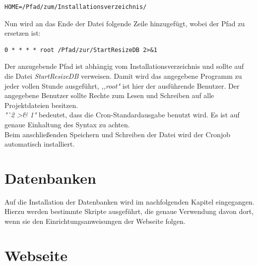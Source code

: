 \documentclass[fontsize = 12pt, paper = a4]{scrreprt}
\begin{document}
\vspace*{4mm}
\begin{lstlisting}[frame=single]
HOME=/Pfad/zum/Installationsverzeichnis/ 
\end{lstlisting} 
\vspace*{-2mm}

\newpage


Nun wird an das Ende der Datei folgende Zeile hinzugefügt, wobei der Pfad zu ersetzen ist:

\vspace*{4mm}
\begin{lstlisting}[frame=single]
0 * * * * root /Pfad/zur/StartResizeDB 2>&1 
\end{lstlisting} 
\vspace*{-2mm}


Der anzugebende Pfad ist abhängig vom Installationsverzeichnis und sollte auf die Datei \textit{StartResizeDB} verweisen.
Damit wird das angegebene Programm zu jeder vollen Stunde ausgeführt, \textit{,,root"} ist hier der ausführende Benutzer. Der angegebene Benutzer sollte Rechte zum Lesen und Schreiben auf alle Projektdateien besitzen.\\
\textit{"`2 \textgreater \& 1"} bedeutet, dass die Cron-Standardausgabe benutzt wird.
Es ist auf genaue Einhaltung des Syntax zu achten.\\
Beim anschließenden Speichern und Schreiben der Datei wird der Cronjob automatisch installiert.









\section{Datenbanken}

Auf die Installation der Datenbanken wird im nachfolgenden Kapitel eingegangen. Hierzu werden bestimmte Skripte ausgeführt, die genaue Verwendung davon dort, wenn sie den Einrichtungsanweisungen der Webseite folgen.




\newpage


\section{Webseite}
\end{document}
